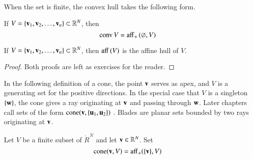 When the set is finite, the convex hull takes the following form.

\begin{lemma}[]
If $V = \{{\mathbf v}_1,{\mathbf v}_2,\ldots,{\mathbf v}_n\}\subset\mathbb{R}^N$, then
	\begin{displaymath}
{\operatorname{conv}}\, V = {\operatorname{aff}}_+\, (\varnothing,V)
\end{displaymath}
%
%
\end{lemma}

\begin{lemma}[]
If $V = \{{\mathbf v}_1,{\mathbf v}_2,\ldots,{\mathbf v}_n\}\subset\mathbb{R}^N$, then
${\operatorname{aff}}\, (V)$
is the affine hull of $V$.
\end{lemma}

\begin{proof}  Both proofs are left as  exercises for the reader.
\end{proof}

In the following definition of a cone, the point ${\mathbf v}$ serves as apex,
and $V$ is a generating set for the positive directions.  In the
special case that $V$ is a singleton $\{{\mathbf w}\}$, the cone gives a ray
originating at ${\mathbf v}$ and passing through ${\mathbf w}$.  Later chapters call
sets of the form ${\operatorname{cone}}({\mathbf v},\{{\mathbf u}_1,{\mathbf u}_2\})$ .
Blades are planar sets bounded by two rays originating at ${\mathbf v}$.
%
%
%

\begin{definition}[cone]
Let $V$ be a finite subset of
$\ring{R}^N$ and let ${\mathbf v}\in\mathbb{R}^N$. Set
\begin{displaymath}
{\operatorname{cone}}({\mathbf v},V) = {\operatorname{aff}}_+(\{{\mathbf v}\},V)
\end{displaymath}
%
%
\end{definition}




